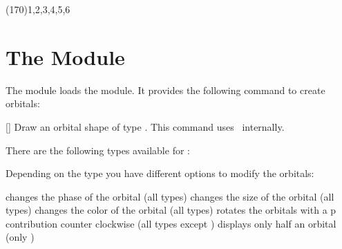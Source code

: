 \documentclass{chemmacros-manual}
\begin{document}
\begin{example}
   \newman{}
  \newman[scale=.75,ring={draw=blue,fill=blue!20}]{}
\end{example}

\begin{example}
\end{example}

\begin{example}
   \newman(170){1,2,3,4,5,6}
\end{example}

\section{The  Module}\label{sec:orbital-module}
The  module loads the  module.  It
provides the following command to create orbitals:
\begin{commands}
  []
    Draw an orbital shape of type .  This command uses \TikZ\
    internally.
\end{commands}

There are the following types available for :
\begin{center}
   \quad
   \quad
   \quad
   \quad
\end{center}

\begin{example}
      
\end{example}

Depending on the type you have different options to modify the orbitals:
\begin{options}
  \Default{+}
    changes the phase of the orbital (all types)
    changes the size of the orbital (all types)
    changes the color of the orbital (all types)
    rotates the orbitals with a p contribution counter clockwise (all types
    except \code{s})
    displays only half an orbital (only )
\end{options}
\end{document}

